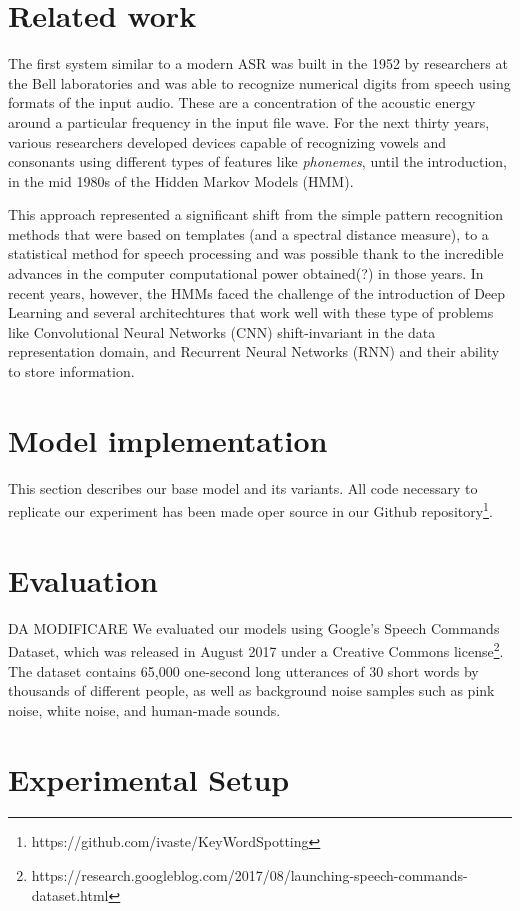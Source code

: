 \documentclass[conference]{IEEEtran}
\begin{document}
\section{Related work}
The first system similar to a modern ASR was built in the 1952 by researchers at the Bell laboratories and was able to recognize numerical digits from speech using formats of the input audio. These are a concentration of the acoustic energy around a particular frequency in the input file wave. For the next thirty years, various researchers developed devices capable of recognizing vowels and consonants using different types of features like \textit{phonemes}, until the introduction, in the mid 1980s of the Hidden Markov Models (HMM). 

This approach represented a significant shift from the simple pattern recognition methods that were based on templates (and a spectral distance measure), to a statistical method for speech processing and was possible thank to the incredible advances in the computer computational power obtained(?) in those years. In recent years, however, the HMMs faced the challenge of the introduction of Deep Learning and several architechtures that work well with these type of problems like Convolutional Neural Networks (CNN) shift-invariant in the data representation domain, and Recurrent Neural Networks (RNN) and their ability to store information.
\section{Model implementation}
This section describes our base model and its variants. All code necessary to replicate our experiment has been made oper source in our Github repository\footnote{https://github.com/ivaste/KeyWordSpotting}.
\section{Evaluation}
DA MODIFICARE We evaluated our models using Google’s Speech Commands Dataset, which was released in August 2017 under a Creative Commons license\footnote{https://research.googleblog.com/2017/08/launching-speech-commands-dataset.html}. The dataset contains 65,000
one-second long utterances of 30 short words by thousands of
different people, as well as background noise samples such as
pink noise, white noise, and human-made sounds.
\section{Experimental Setup}
\end{document}
